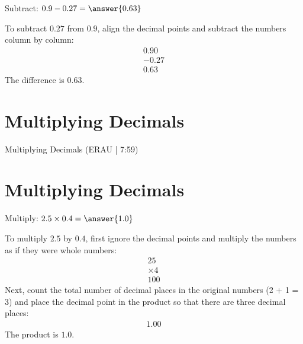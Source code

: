 \documentclass{ximera}
\begin{document}
\begin{problem}
Subtract: $0.9 - 0.27 = \answer{0.63}$
\begin{feedback}
To subtract $0.27$ from $0.9$, align the decimal points and subtract the numbers column by column:
\begin{align*}
  0.90 \\
- 0.27 \\
\hline
  0.63
\end{align*}
The difference is $0.63$.
\end{feedback}
\end{problem}


\section*{Multiplying Decimals}

Multiplying Decimals (ERAU | 7:59)



\section*{Multiplying Decimals}

\begin{problem}
Multiply: $2.5 \times 0.4 = \answer{1.0}$
\begin{feedback}
To multiply $2.5$ by $0.4$, first ignore the decimal points and multiply the numbers as if they were whole numbers:
\begin{align*}
  25 \\
\times 4 \\
\hline
  100
\end{align*}
Next, count the total number of decimal places in the original numbers (2 + 1 = 3) and place the decimal point in the product so that there are three decimal places:
\begin{align*}
  1.00
\end{align*}
The product is $1.0$.
\end{feedback}
\end{problem}
\end{document}
